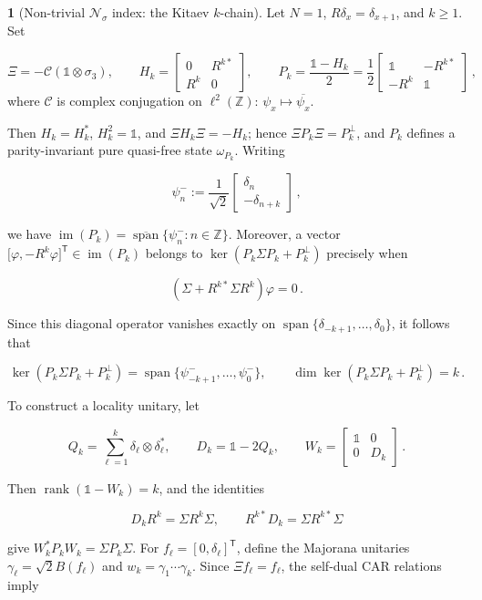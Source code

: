 \documentclass[a4paper,10pt]{article}
\numberwithin{equation}{section}
\theoremstyle{plain}
\theoremstyle{plain}
\theoremstyle{plain}
\theoremstyle{plain}
\theoremstyle{plain}
\theoremstyle{remark}
\theoremstyle{definition}
\newtheorem{example}[example]{\protect\examplename}
\providecommand{\examplename}{Example}
\newcommand{\ZZ}{\mathbb{Z}}
\newcommand{\calC}{\mathcal{C}}
\newcommand{\calN}{\mathcal{N}}
\newcommand{\szpan}{\operatorname{span}}
\newcommand{\Id}{\mathds{1}}
\newcommand{\rank}{\operatorname{rank}}
\newcommand{\im}{\operatorname{im}}
\begin{document}
\begin{example}[Non-trivial \(\calN_\sigma\) index: the Kitaev \(k\)-chain]\label{example:Kitaev chain}
Let \(N=1\), \(R\delta_x=\delta_{x+1}\), and \(k\geq1\). Set

$$
\Xi=-\calC(\Id\otimes\sigma_3),\qquad
H_k=\begin{bmatrix}0&R^{k*}\\ R^k&0\end{bmatrix},\qquad
P_k=\frac{\Id-H_k}{2}
=\frac12\begin{bmatrix}\Id&-R^{k*}\\-R^k&\Id\end{bmatrix}\, ,
$$ where $\calC$ is complex conjugation on $\ell^2(\ZZ)$: $\psi_x\mapsto\overline{\psi_x}$.

Then \(H_k=H_k^*\), \(H_k^2=\Id\), and \(\Xi H_k\Xi=-H_k\); hence \(\Xi P_k\Xi=P_k^\perp\), and \(P_k\) defines a parity-invariant pure quasi-free state \(\omega_{P_k}\). Writing

$$
\psi_n^-:=\frac1{\sqrt2}
\begin{bmatrix}\delta_n\\-\delta_{n+k}\end{bmatrix}\, ,
$$

we have \(\im(P_k)=\overline{\szpan}\{\psi_n^-:n\in\ZZ\}\). Moreover, a vector \(\bigl[\varphi,-R^k\varphi\bigr]^{\mathsf T}\in\im(P_k)\) belongs to \(\ker(P_k\Sigma P_k+P_k^\perp)\) precisely when

$$
(\Sigma+R^{k*}\Sigma R^k)\varphi=0\,.
$$

Since this diagonal operator vanishes exactly on \(\szpan\{\delta_{-k+1},\ldots,\delta_0\}\), it follows that

$$
\ker(P_k\Sigma P_k+P_k^\perp)
=\szpan\{\psi_{-k+1}^-,\ldots,\psi_0^-\},
\qquad
\dim\ker(P_k\Sigma P_k+P_k^\perp)=k\,.
$$

To construct a locality unitary, let

$$
Q_k=\sum_{\ell=1}^k\delta_\ell\otimes\delta_\ell^*,
\qquad D_k=\Id-2Q_k,\qquad
W_k=\begin{bmatrix}\Id&0\\0&D_k\end{bmatrix}\,.
$$

Then \(\rank(\Id-W_k)=k\), and the identities

$$
D_kR^k=\Sigma R^k\Sigma,\qquad
R^{k*}D_k=\Sigma R^{k*}\Sigma
$$

give \(W_k^*P_kW_k=\Sigma P_k\Sigma\). For \(f_\ell=[0,\delta_\ell]^{\mathsf T}\), define the Majorana unitaries \(\gamma_\ell=\sqrt2B(f_\ell)\) and \(w_k=\gamma_1\cdots\gamma_k\). Since \(\Xi f_\ell=f_\ell\), the self-dual CAR relations imply


\end{example}
\end{document}
